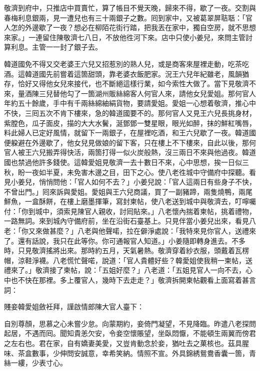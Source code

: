 敬濟到府中，只推店中買賣忙，算了帳目不覺天晚，歸來不得，歇了一夜。交割與春梅利息銀兩，見一遭兒也有三十兩銀子之數。囘到家中，又被葛翠屏聐聒：「官人怎的外邊歇了一夜？想必在柳陌花街行踏，把我丟在家中，獨自空房，就不思想來家。」一連留住陳敬濟七八日，不放他徃河下來。店中只使小姜兒，來問主管討算利息。主管一一封了銀子去。

韓道國免不得又交老婆王六兒又招惹別的熟人兒，{}或是商客來屋裡走動，吃茶吃酒。這韓道國先前嘗着這箇甜頭，靠老婆衣飯肥家。況王六兒年紀雖老，風韻猶存，恰好又得他女兒來接代，也不斷絕這樣行業，如今索性大做了。當下見敬濟不來，量酒陳三兒替他勾了一箇湖州販絲綿客人何官人來，請他女兒愛姐。那何官人年約五十餘歲，手中有千兩絲綿紬絹貨物，要請愛姐。愛姐一心想着敬濟，推心中不快，三囘五次不肯下樓來，急的韓道國要不的。那何官人又見王六兒長挑身材，紫膛色，瓜子面皮，描的大大水鬢，涎鄧鄧一雙星眼，眼光如醉，抹的鮮紅嘴唇，料此婦人已定好風情，{}就留下一兩銀子，在屋裡吃酒，和王六兒歇了一夜。韓道國便躱避在外邊歇了，他女兒見做娘的留下客，只在樓上不下樓來，自此以後，那何官人被王六兒搬弄得快活，兩箇打得一似火炭般熱，沒三兩日不來與他過夜。韓道國也禁過他許多錢使。{}這韓愛姐見敬濟一去十數日不來，心中思想，挨一日似三秋，盼一夜如半夏，未免害木邊之目，田下之心。使八老徃城中守備府中探聽。看見小姜兒，悄悄問他：「官人如何不去？」小姜兒說：「官人這兩日有些身子不快，不曾出門。」囘來訴與愛姐。愛姐與王六兒商議，買了一副豬蹄，兩隻燒鴨，兩尾鮮魚，一盒酥餅，在樓上磨墨揮筆，寫封柬帖，使八老送到城中與敬濟去，叮嚀囑付：「你到城中，須索見陳官人親收，討囘貼來。」八老懷內揣着柬帖，挑着禮物，一路無詞。來到城內守備府前，坐在沿街石臺基上。只見伴當小姜兒出來，看見八老：「你又來做甚麼？」八老與他聲喏，拉在僻淨處說：「我特來見你官人，送禮來了。還有話說，我只在此等你。你可通報官人知道。」小姜隨即轉身進去。不多時，只見敬濟搖將出來。那時約五月，天氣暑熱。敬濟穿着紗衣服，頭戴着瓦楞帽，涼鞋淨襪。八老慌忙聲喏，說道：「官人貴體好些？韓愛姐使我稍一柬帖，送禮來了。」敬濟接了柬帖，說：「五姐好麼？」八老道：「五姐見官人一向不去，心中也不快在那裡。多上覆官人，幾時下去走走？」敬濟拆開柬帖觀看上面寫着甚言詞：

\begin{myquote}[\markfont]
賤妾韓愛姐斂衽拜，謹啟情郎陳大官人臺下：

自別尊顏，思慕之心未嘗少怠。向蒙期約，妾倚門凝望，不見降臨。昨遣八老探問起居，不遇而囘。聞知貴恙欠安，令妾空懷賬望，坐臥悶懨，不能頓生兩翼而傍君之左右也。君在家，自有嬌妻美愛，又豈肯動念於妾，猶吐去之菓核也。茲具腥味、茶盒數事，少伸問安誠意，幸希笑納。情照不宣。{}外具錦綉鴛鴦香囊一箇，青絲一縷，少表寸心。

\end{myquote}

